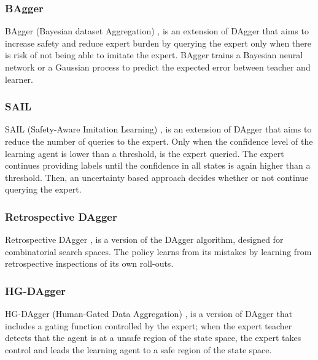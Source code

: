 \subsubsection*{BAgger}
BAgger (Bayesian  dataset  Aggregation) \cite{BAgger-Cronrath:2018}, is an extension of DAgger \cite{DAgger-Ross:2011} that aims to increase safety and reduce expert burden by querying the expert only when there is risk of not being able to imitate the expert. BAgger trains a Bayesian neural network or a Gaussian process to predict the expected error between teacher and learner.


















\subsubsection*{SAIL}
SAIL (Safety-Aware Imitation Learning) \cite{SAIL-Xiong:2019}, is an extension of DAgger that aims to reduce the number of queries to the expert. Only when the confidence level of the learning agent is lower than a threshold, is the expert queried. The expert continues providing labels until the confidence in all states is again higher than a threshold. Then, an uncertainty based approach decides whether or not continue querying the expert.

\subsubsection*{Retrospective DAgger}
Retrospective DAgger \cite{Retrospective-DAgger-song:2019}, is a version of the DAgger \cite{DAgger-Ross:2011} algorithm, designed for combinatorial search spaces. The policy learns from its mistakes by learning from retrospective inspections of its own roll-outs.  

\subsubsection*{HG-DAgger}
HG-DAgger (Human-Gated Data Aggregation) \cite{HG-DAgger-Kelly:2019}, is a version of DAgger \cite{DAgger-Ross:2011} that includes a gating function controlled by the expert; when the expert teacher detects that the agent is at a unsafe region of the state space, the expert takes control and leads the learning agent to a safe region of the state space.

